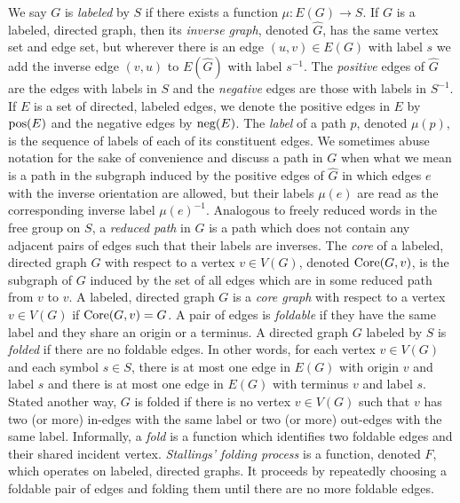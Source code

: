 \documentclass{article}
\newcommand{\Core}{\textnormal{Core}}
\newcommand{\pos}{\textnormal{pos}}
\newcommand{\neg}{\textnormal{neg}}
\begin{document}
We say $G$ is \emph{labeled} by $S$ if there exists a function $\mu \colon E(G) \to S$.
If $G$ is a labeled, directed graph, then its \emph{inverse graph}, denoted $\hat{G}$, has the same vertex set and edge set, but wherever there is an edge $(u, v) \in E(G)$ with label $s$ we add the inverse edge $(v, u)$ to $E(\hat{G})$ with label $s^{-1}$.
The \emph{positive} edges of $\hat{G}$ are the edges with labels in $S$ and the \emph{negative} edges are those with labels in $S^{-1}$.
If $E$ is a set of directed, labeled edges, we denote the positive edges in $E$ by $\pos(E)$ and the negative edges by $\neg(E)$.
The \emph{label} of a path $p$, denoted $\mu(p)$, is the sequence of labels of each of its constituent edges.
We sometimes abuse notation for the sake of convenience and discuss a path in $G$ when what we mean is a path in the subgraph induced by the positive edges of $\hat{G}$ in which edges $e$ with the inverse orientation are allowed, but their labels $\mu(e)$ are read as the corresponding inverse label $\mu(e)^{-1}$.
Analogous to freely reduced words in the free group on $S$, a \emph{reduced path} in $G$ is a path which does not contain any adjacent pairs of edges such that their labels are inverses.
The \emph{core} of a labeled, directed graph $G$ with respect to a vertex $v \in V(G)$, denoted $\Core(G, v)$, is the subgraph of $G$ induced by the set of all edges which are in some reduced path from $v$ to $v$.
A labeled, directed graph $G$ is a \emph{core graph} with respect to a vertex $v \in V(G)$ if $\Core(G, v) = G$.
A pair of edges is \emph{foldable} if they have the same label and they share an origin or a terminus.
A directed graph $G$ labeled by $S$ is \emph{folded} if there are no foldable edges.
In other words, for each vertex $v \in V(G)$ and each symbol $s \in S$, there is at most one edge in $E(G)$ with origin $v$ and label $s$ and there is at most one edge in $E(G)$ with terminus $v$ and label $s$.
Stated another way, $G$ is folded if there is no vertex $v \in V(G)$ such that $v$ has two (or more) in-edges with the same label or two (or more) out-edges with the same label.
Informally, a \emph{fold} is a function which identifies two foldable edges and their shared incident vertex.
\emph{Stallings' folding process} is a function, denoted $F$, which operates on labeled, directed graphs.
It proceeds by repeatedly choosing a foldable pair of edges and folding them until there are no more foldable edges.
\end{document}
